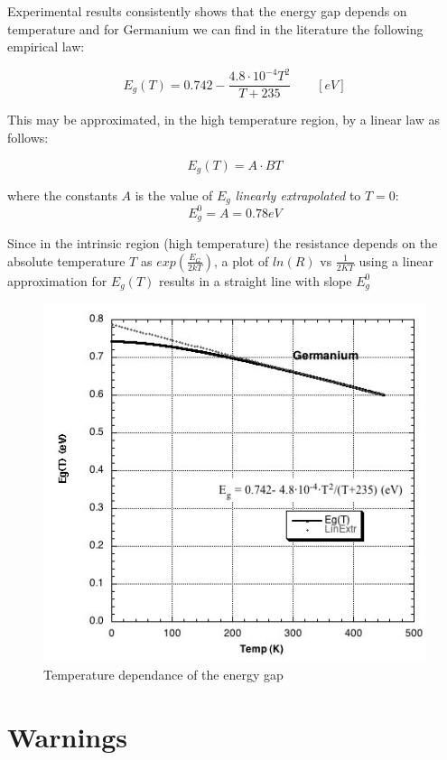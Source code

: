 \documentclass[]{book}
\begin{document}
Experimental results consistently shows that the energy gap depends on
temperature and for Germanium we can find in the literature the
following empirical law:

\begin{equation}
E_{ g }(T)=0.742-\frac { 4.8\cdot 10^{ -4 }T^{ 2 } }{ T+235 } \quad \quad [eV]
\label{eq:eGempiricalLaw}
\end{equation}

This may be approximated, in the high temperature region, by a linear
law as follows:

\[E_g (T) = A \cdot BT\]

where the constants \(A\) is the value of \(E_g\) \emph{linearly
extrapolated} to \(T=0\): \[E^0_g = A = 0.78eV\]

Since in the intrinsic region (high temperature) the resistance depends
on the absolute temperature \(T\) as \(exp( \frac{E_G}{2kT})\), a plot
of \(ln( R )\) vs \(\frac{1}{2 K T}\) using a linear approximation for
\(E_g(T)\) results in a straight line with slope \(E^0_g\)

\begin{figure}

{\centering \includegraphics[width=0.65\linewidth]{Assets/Figures/Eg_vs_T} 

}

\caption{Temperature dependance of the energy gap}\label{fig:EgTdependance}
\end{figure}

\clearpage

\chapter{Warnings}\label{warnings}
\end{document}
